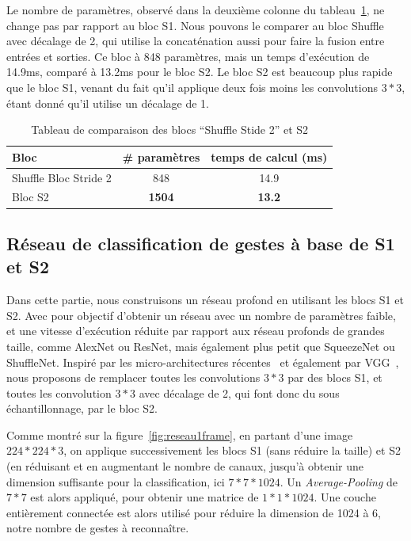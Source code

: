 Le nombre de paramètres, observé dans la deuxième colonne du tableau~\ref{tab:blocS2}, ne change pas par rapport au bloc S1.
Nous pouvons le comparer au bloc Shuffle avec décalage de 2, qui utilise la concaténation aussi pour faire la fusion entre entrées et sorties.
Ce bloc à 848 paramètres, mais un temps d'exécution de 14.9ms, comparé à 13.2ms pour le bloc S2. 
Le bloc S2 est beaucoup plus rapide que le bloc S1, venant du fait qu'il applique deux fois moins les convolutions $3*3$, étant donné qu'il utilise un décalage de 1.

\begin{table}[h]
\centering
\begin{tabular}{|l|c|c|}
\hline
Bloc & \# paramètres & temps de calcul (ms) \\
\hline
\hline
Shuffle Bloc Stride 2 & 848 & 14.9 \\
\hline
Bloc S2 & \textbf{1504} & \textbf{13.2}\\
\hline
\end{tabular}
\caption{Tableau de comparaison des blocs ``Shuffle Stide 2'' et S2}
\label{tab:blocS2}
\end{table}



\subsection{Réseau de classification de gestes à base de S1 et S2}

Dans cette partie, nous construisons un réseau profond en utilisant les blocs S1 et S2.
Avec pour objectif d’obtenir un réseau avec un nombre de paramètres faible, et une vitesse d'exécution réduite par rapport aux réseau profonds de grandes taille, comme AlexNet ou ResNet, mais également plus petit que SqueezeNet ou ShuffleNet.
Inspiré par les micro-architectures récentes~\cite{howard2017mobilenets, zhang2017shufflenet,hu2017squeeze, iandola2016squeezenet} et également par VGG~\cite{simonyan2014very}, nous proposons de remplacer toutes les convolutions $3*3$ par des blocs S1, et toutes les convolution $3*3$ avec décalage de 2, qui font donc du sous échantillonnage, par le bloc S2. 

Comme montré sur la figure~\ref{fig:reseau1frame}, en partant d'une image $224*224*3$, on applique successivement les blocs S1 (sans réduire la taille) et S2 (en réduisant et en augmentant le nombre de canaux, jusqu'à obtenir une dimension suffisante pour la classification, ici $7*7*1024$.
Un \textit{Average-Pooling} de $7*7$ est alors appliqué, pour obtenir une matrice de $1*1*1024$.
Une couche entièrement connectée est alors utilisé pour réduire la dimension de 1024 à 6, notre nombre de gestes à reconnaître.

